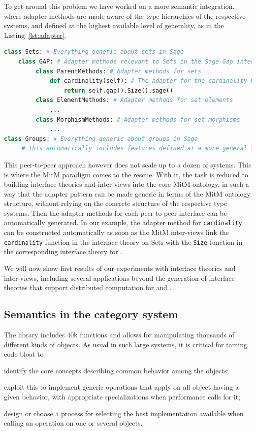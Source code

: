 To get around this problem we have worked on a more semantic
integration, where adapter methods are made aware of the type
hierarchies of the respective systems, and defined at the highest
available level of generality, as in the Listing~\ref{lst:adapter}.
\begin{lstlisting}[language=Python,label=lst:adapter,
  caption=A semantic adapter method in \Sage]
class Sets: # Everything generic about sets in Sage
    class GAP: # Adapter methods relevant to Sets in the Sage-Gap interface
         class ParentMethods: # Adapter methods for sets
             def cardinality(self): # The adapter for the cardinality method
                 return self.gap().Size().sage()
         class ElementMethods: # Adapter methods for set elements
             ...
         class MorphismMethods: # Adapter methods for set morphisms
             ...
class Groups: # Everything generic about groups in Sage
     # This automatically includes features defined at a more general level
\end{lstlisting}

This peer-to-peer approach however does not scale up to a dozen of
systems. This is where the MitM paradigm comes to the rescue. With it,
the task is reduced to building interface theories and inter-views into
the core MitM ontology, in such a way that the adapter pattern can be
made generic in terms of the MitM ontology structure, without relying
on the concrete structure of the respective type systems. Then the
adapter methods for each peer-to-peer interface can be automatically
generated.
%
In our example, the adapter method for \texttt{cardinality} can be
constructed automatically as soon as the MitM inter-views link the
\texttt{cardinality} function in the \Sage interface theory on Sets
with the \texttt{Size} function in the corresponding interface theory
for \GAP.

We will now show first results of our experiments with interface
theories and inter-views, including several applications beyond the
generation of interface theories that support distributed computation
for \Sage and \GAP.

\subsection{Semantics in the \Sage category system}

The \Sage library includes 40k functions and allows for manipulating
thousands of different kinds of objects. As usual in such large
systems, it is critical for taming code bloat to
\begin{compactenum}[\em i\rm)]
\item identify the core concepts describing common behavior among the objects;
\item exploit this to implement generic operations that apply on all object having a given
  behavior, with appropriate specializations when performance calls for it;
\item design or choose a process for selecting the best implementation available when
  calling an operation on one or several objects.
\end{compactenum}

